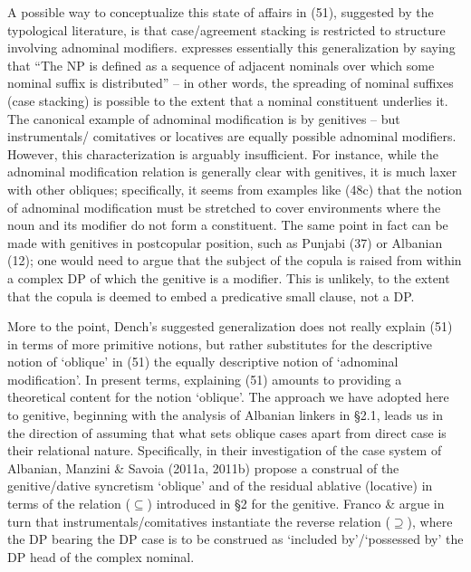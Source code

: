 \documentclass[output=paper]{langsci/langscibook}
\begin{document}
A possible way to conceptualize this state of affairs in (51), suggested by the typological literature, is that case/agreement stacking is restricted to structure involving adnominal modifiers. \citet[386]{Dench1995} expresses essentially this generalization by saying that “The NP is defined as a sequence of adjacent nominals over which some nominal suffix is distributed” – in other words, the spreading of nominal suffixes (case stacking) is possible to the extent that a nominal constituent underlies it. The canonical example of adnominal modification is by genitives – but instrumentals/ comitatives or locatives are equally possible adnominal modifiers. However, this characterization is arguably insufficient. For instance, while the adnominal modification relation is generally clear with genitives, it is much laxer with other obliques; specifically, it seems from examples like (48c) that the notion of adnominal modification must be stretched to cover environments where the noun and its modifier do not form a constituent. The same point in fact can be made with genitives in postcopular position, such as Punjabi (37) or Albanian (12); one would need to argue that the subject of the copula is raised from within a complex DP of which the genitive is a modifier. This is unlikely, to the extent that the copula is deemed to embed a predicative small clause, not a DP.

More to the point, Dench’s suggested generalization does not really explain (51) in terms of more primitive notions, but rather substitutes for the descriptive notion of ‘oblique’ in (51) the equally descriptive notion of ‘adnominal modification’. In present terms, explaining (51) amounts to providing a theoretical content for the notion ‘oblique’. The approach we have adopted here to genitive, beginning with the analysis of Albanian linkers in §2.1, leads us in the direction of assuming that what sets oblique cases apart from direct case is their relational nature. Specifically, in their investigation of the case system of Albanian, Manzini \& Savoia (2011a, 2011b) propose a construal of the genitive/dative syncretism ‘oblique’ and of the residual ablative (locative) in terms of the relation ($\subseteq$) introduced in §2 for the genitive. Franco \& \citet{Manzini2015} argue in turn that instrumentals/comitatives instantiate the reverse relation ($\supseteq$), where the DP bearing the DP case is to be construed as ‘included by’/‘possessed by’ the DP head of the complex nominal. 
\end{document}
